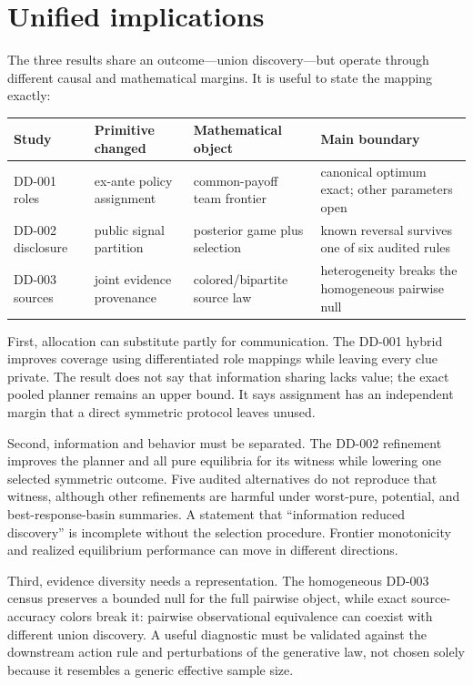\documentclass[11pt]{article}
\theoremstyle{remark}
\begin{document}
\section{Unified implications}
The three results share an outcome---union discovery---but operate through
different causal and mathematical margins. It is useful to state the mapping
exactly:

\begin{center}
\small
\begin{tabularx}{\textwidth}{P{.15\textwidth}YYY}
\toprule
Study & Primitive changed & Mathematical object & Main boundary\\
\midrule
DD-001 roles & ex-ante policy assignment & common-payoff team frontier & canonical optimum exact; other parameters open\\
DD-002 disclosure & public signal partition & posterior game plus selection & known reversal survives one of six audited rules\\
DD-003 sources & joint evidence provenance & colored/bipartite source law & heterogeneity breaks the homogeneous pairwise null\\
\bottomrule
\end{tabularx}
\end{center}

First, allocation can substitute partly for communication. The DD-001 hybrid
improves coverage using differentiated role mappings while leaving every clue
private. The result does not say that information sharing lacks value; the exact
pooled planner remains an upper bound. It says assignment has an independent
margin that a direct symmetric protocol leaves unused.

Second, information and behavior must be separated. The DD-002 refinement
improves the planner and all pure equilibria for its witness while lowering one
selected symmetric outcome. Five audited alternatives do not reproduce that
witness, although other refinements are harmful under worst-pure, potential, and
best-response-basin summaries. A statement that ``information reduced discovery''
is incomplete without the selection procedure. Frontier monotonicity and realized
equilibrium performance can move in different directions.

Third, evidence diversity needs a representation. The homogeneous DD-003 census
preserves a bounded null for the full pairwise object, while exact source-accuracy
colors break it: pairwise observational equivalence can coexist with different
union discovery. A useful diagnostic must be validated against the downstream
action rule and perturbations of the generative law, not chosen solely because it
resembles a generic effective sample size.
\end{document}
